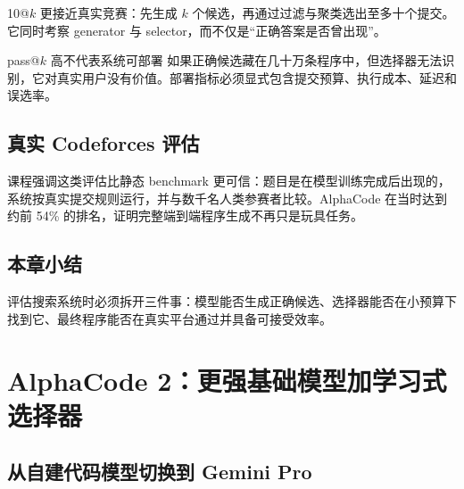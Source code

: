 \documentclass[a4paper]{article}
\begin{document}
10@$k$ 更接近真实竞赛：先生成 $k$ 个候选，再通过过滤与聚类选出至多十个提交。它同时考察 generator 与 selector，而不仅是“正确答案是否曾出现”。


\begin{warningbox}{pass@$k$ 高不代表系统可部署}
如果正确候选藏在几十万条程序中，但选择器无法识别，它对真实用户没有价值。部署指标必须显式包含提交预算、执行成本、延迟和误选率。
\end{warningbox}

\subsection{真实 Codeforces 评估}


课程强调这类评估比静态 benchmark 更可信：题目是在模型训练完成后出现的，系统按真实提交规则运行，并与数千名人类参赛者比较。AlphaCode 在当时达到约前 54\% 的排名，证明完整端到端程序生成不再只是玩具任务。


\subsection{本章小结}

评估搜索系统时必须拆开三件事：模型能否生成正确候选、选择器能否在小预算下找到它、最终程序能否在真实平台通过并具备可接受效率。

\section{AlphaCode 2：更强基础模型加学习式选择器}

\subsection{从自建代码模型切换到 Gemini Pro}

\end{document}
